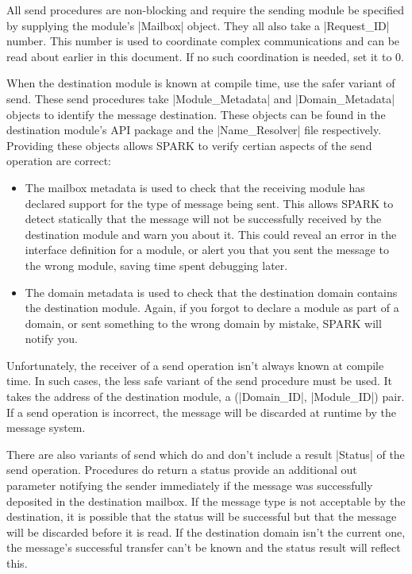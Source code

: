 All send procedures are non-blocking and require the sending module be specified by supplying the module's |Mailbox| object. They all also take a |Request_ID| number. This number is used to coordinate complex communications and can be read about earlier in this document. If no such coordination is needed, set it to 0.

When the destination module is known at compile time, use the safer variant of send. These send procedures take |Module_Metadata| and |Domain_Metadata| objects to identify the message destination. These objects can be found in the destination module's API package and the |Name_Resolver| file respectively. Providing these objects allows SPARK to verify certian aspects of the send operation are correct:

\begin{itemize}
\item The mailbox metadata is used to check that the receiving module has declared support for the type of message being sent. This allows SPARK to detect statically that the message will not be successfully received by the destination module and warn you about it. This could reveal an error in the interface definition for a module, or alert you that you sent the message to the wrong module, saving time spent debugging later.

\item The domain metadata is used to check that the destination domain contains the destination module. Again, if you forgot to declare a module as part of a domain, or sent something to the wrong domain by mistake, SPARK will notify you.
\end{itemize}

Unfortunately, the receiver of a send operation isn't always known at compile time. In such cases, the less safe variant of the send procedure must be used. It takes the address of the destination module, a (|Domain_ID|, |Module_ID|) pair. If a send operation is incorrect, the message will be discarded at runtime by the message system.

There are also variants of send which do and don't include a result |Status| of the send operation. Procedures do return a status provide an additional out parameter notifying the sender immediately if the message was successfully deposited in the destination mailbox. If the message type is not acceptable by the destination, it is possible that the status will be successful but that the message will be discarded before it is read. If the destination domain isn't the current one, the message's successful transfer can't be known and the status result will reflect this.



